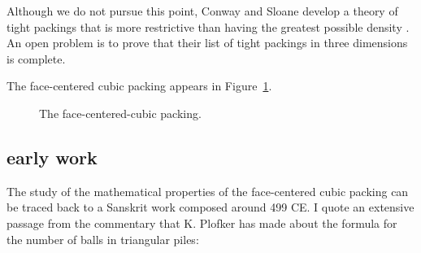 Although we do not pursue this point, Conway and Sloane develop
a theory of tight packings that is more restrictive than having the
greatest possible density \cite{CoSl95}.
An open problem is to prove that their
list of tight packings in three dimensions is complete.

The face-centered cubic packing appears in
Figure~\ref{fig:fcc-pack}.

\begin{figure}[htb]
  \centering
  \caption{The face-centered-cubic packing.}
  \label{fig:fcc-pack}
\end{figure}


\subsection{early work}
\label{sec:early}

The study of the mathematical properties of the face-centered cubic
packing can be traced back to a Sanskrit work composed around 499 CE.
I quote an extensive passage from the commentary that K. Plofker
has made about the formula
for the number of balls in triangular piles\cite{Plo00}:
\medskip

